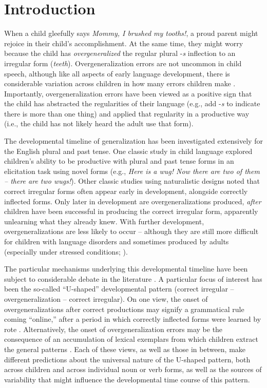 \documentclass[
   11pt,
       ]{book}
\begin{document}
\hypertarget{introduction-1}{%
\section{Introduction}\label{introduction-1}}

When a child gleefully says \emph{Mommy, I brushed my tooths!}, a proud parent might rejoice in their child's accomplishment. At the same time, they might worry because the child has \emph{overgeneralized} the regular plural -\emph{s} inflection to an irregular form (\emph{teeth}). Overgeneralization errors are not uncommon in child speech, although like all aspects of early language development, there is considerable variation across children in how many errors children make \citep{marcus1992, maratsos1993}. Importantly, overgeneralization errors have been viewed as a positive sign that the child has abstracted the regularities of their language (e.g., add -\emph{s} to indicate there is more than one thing) and applied that regularity in a productive way (i.e., the child has not likely heard the adult use that form).

The developmental timeline of generalization has been investigated extensively for the English plural and past tense. One classic study in child language \citep{berko1958} explored children's ability to be productive with plural and past tense forms in an elicitation task using novel forms (e.g., \emph{Here is a wug! Now there are two of them -- there are two wugs!}). Other classic studies using naturalistic designs \citep{cazden1968, brown1973} noted that correct irregular forms often appear early in development, alongside correctly inflected forms. Only later in development are overgeneralizations produced, \emph{after} children have been successful in producing the correct irregular form, apparently unlearning what they already knew. With further development, overgeneralizations are less likely to occur -- although they are still more difficult for children with language disorders \citep{marchman1999} and sometimes produced by adults (especially under stressed conditions; \citealp{mcdonald2010}).

The particular mechanisms underlying this developmental timeline have been subject to considerable debate in the literature \citep{marcus1992, elman1996}. A particular focus of interest has been the so-called ``U-shaped'' developmental pattern (correct irregular -- overgeneralization -- correct irregular). On one view, the onset of overgeneralizations after correct productions may signify a grammatical rule coming ``online,'' after a period in which correctly inflected forms were learned by rote \citep{pinker1998}. Alternatively, the onset of overgeneralization errors may be the consequence of an accumulation of lexical exemplars from which children extract the general patterns \citep{marchman1994, plunkett1989}. Each of these views, as well as those in between, make different predictions about the universal nature of the U-shaped pattern, both across children and across individual noun or verb forms, as well as the sources of variability that might influence the developmental time course of this pattern.
\end{document}
